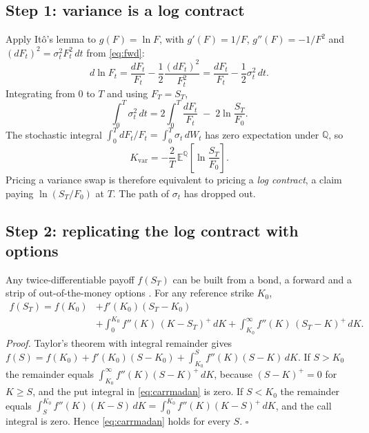 \documentclass[12pt]{article}
\newcommand{\E}{\mathbb{E}^{\mathbb{Q}}}
\newcommand{\Kvar}{K_{\mathrm{var}}}
\begin{document}
\subsection{Step 1: variance is a log contract}

Apply It\^o's lemma to $g(F)=\ln F$, with $g'(F)=1/F$, $g''(F)=-1/F^2$ and $(dF_t)^2=\sigma_t^2F_t^2\,dt$ from \eqref{eq:fwd}:
\begin{equation}
  d\ln F_t = \frac{dF_t}{F_t} - \frac{1}{2}\frac{(dF_t)^2}{F_t^2}
           = \frac{dF_t}{F_t} - \frac{1}{2}\sigma_t^2\,dt .
\end{equation}
Integrating from $0$ to $T$ and using $F_T=S_T$,
\begin{equation}
  \int_0^T \sigma_t^2\,dt = 2\int_0^T \frac{dF_t}{F_t} \;-\; 2\ln\frac{S_T}{F_0}.
  \label{eq:decomp}
\end{equation}
The stochastic integral $\int_0^T dF_t/F_t=\int_0^T\sigma_t\,dW_t$ has zero expectation under $\mathbb{Q}$, so
\begin{equation}
  \Kvar = -\frac{2}{T}\,\E\!\left[\ln\frac{S_T}{F_0}\right].
  \label{eq:logcontract}
\end{equation}
Pricing a variance swap is therefore equivalent to pricing a \emph{log contract}, a claim paying $\ln(S_T/F_0)$ at $T$. The path of $\sigma_t$ has dropped out.

\subsection{Step 2: replicating the log contract with options}

Any twice-differentiable payoff $f(S_T)$ can be built from a bond, a forward and a strip of out-of-the-money options \cite{carrmadan}. For any reference strike $K_0$,
\begin{equation}
\begin{split}
  f(S_T) = f(K_0) &+ f'(K_0)(S_T-K_0)\\
  &+ \int_0^{K_0} f''(K)\,(K-S_T)^+\,dK
  + \int_{K_0}^{\infty} f''(K)\,(S_T-K)^+\,dK .
\end{split}
  \label{eq:carrmadan}
\end{equation}
\textit{Proof.} Taylor's theorem with integral remainder gives
$f(S) = f(K_0) + f'(K_0)(S-K_0) + \int_{K_0}^{S} f''(K)(S-K)\,dK$.
If $S>K_0$ the remainder equals $\int_{K_0}^{\infty} f''(K)(S-K)^+\,dK$, because $(S-K)^+=0$ for $K\ge S$, and the put integral in \eqref{eq:carrmadan} is zero. If $S<K_0$ the remainder equals $\int_{S}^{K_0} f''(K)(K-S)\,dK=\int_0^{K_0} f''(K)(K-S)^+\,dK$, and the call integral is zero. Hence \eqref{eq:carrmadan} holds for every $S$. \hfill$\square$
\end{document}
